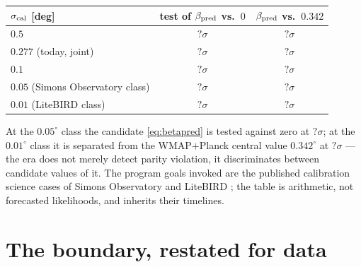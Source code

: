 \documentclass[11pt,a4paper]{article}
\newcommand{\CFDetectHalf}{?}\newcommand{\CFDetectToday}{?}
\newcommand{\CFDetectPointOne}{?}\newcommand{\CFDetectSO}{?}
\newcommand{\CFDetectLB}{?}\newcommand{\CFDiscHalf}{?}
\newcommand{\CFDiscToday}{?}\newcommand{\CFDiscPointOne}{?}
\newcommand{\CFDiscSO}{?}\newcommand{\CFDiscLB}{?}
\theoremstyle{plain}
\theoremstyle{definition}
\begin{document}
\begin{center}
\begin{tabular}{lcc}
\toprule
$\sigma_{\rm cal}$ [deg] & test of $\beta_{\rm pred}$ vs.\ $0$ &
$\beta_{\rm pred}$ vs.\ $0.342$\\
\midrule
$0.5$ & $\CFDetectHalf\sigma$ & $\CFDiscHalf\sigma$\\
$0.277$ (today, joint) & $\CFDetectToday\sigma$ & $\CFDiscToday\sigma$\\
$0.1$ & $\CFDetectPointOne\sigma$ & $\CFDiscPointOne\sigma$\\
$0.05$ (Simons Observatory class) & $\CFDetectSO\sigma$ &
$\CFDiscSO\sigma$\\
$0.01$ (LiteBIRD class) & $\CFDetectLB\sigma$ & $\CFDiscLB\sigma$\\
\bottomrule
\end{tabular}
\end{center}

At the $0.05^{\circ}$ class the candidate \cref{eq:betapred} is tested
against zero at $\CFDetectSO\sigma$; at the $0.01^{\circ}$ class it
is separated from the WMAP$+$Planck central value $0.342^{\circ}$ at
$\CFDiscLB\sigma$ --- the era does not merely detect parity
violation, it discriminates between candidate values of it. The
program goals invoked are the published calibration science cases of
Simons Observatory and LiteBIRD \cite{LiteBIRDBiref}; the table is
arithmetic, not forecasted likelihoods, and inherits their timelines.

\section{The boundary, restated for data}
\label{sec:boundary}
\end{document}
